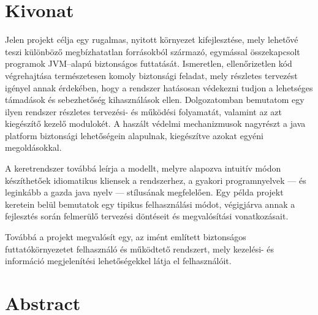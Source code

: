 
%

\begin{otherlanguage}{hungarian}
\chapter*{Kivonat}

Jelen projekt célja egy rugalmas, nyitott környezet kifejlesztése, mely lehetővé teszi különböző megbízhatatlan forrásokból származó, egymással összekapcsolt programok JVM--alapú biztonságos futtatását. Ismeretlen, ellenőrizetlen kód végrehajtása természetesen komoly biztonsági feladat, mely részletes tervezést igényel annak érdekében, hogy a rendszer hatásosan védekezni tudjon a lehetséges támadások és sebezhetőség kihasználások ellen. Dolgozatomban bemutatom egy ilyen rendszer részletes tervezési- és működési folyamatát, valamint az azt kiegészítő kezelő modulokét. A haszált védelmi mechanizmusok nagyrészt a java platform biztonsági lehetőségein alapulnak, kiegészítve azokat egyéni megoldásokkal.

A keretrendszer továbbá leírja a modellt, melyre alapozva intuitív módon készíthetőek idiomatikus kliensek a rendszerhez, a gyakori programnyelvek --- és leginkább a gazda java nyelv --- stílusának megfelelően. Egy példa projekt keretein belül bemutatok egy tipikus felhasználási módot, végigjárva annak a fejlesztés során felmerülő tervezési döntéseit és megvalósítási vonatkozásait. 

Továbbá a projekt megvalósít egy, az imént említett biztonságos futtatókörnyezetet felhasználó és működtető rendszert, mely kezelési- és információ megjelenítési lehetőségekkel látja el felhasználóit. 

\end{otherlanguage}

\chapter*{Abstract}

